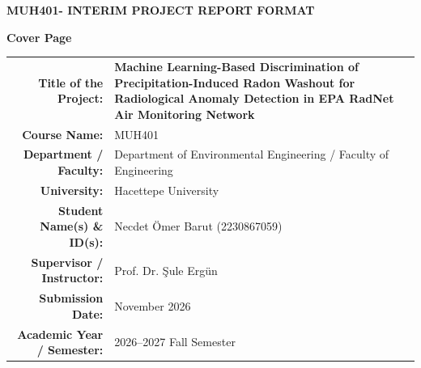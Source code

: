 \documentclass[11pt,a4paper]{article}
\begin{document}
\begin{center}
    {\Large \textbf{MUH401- INTERIM PROJECT REPORT FORMAT}}
\end{center}
\vspace{0.4em}

\begin{framed}
\noindent\textbf{Cover Page}\\[0.4em]
\begin{center}
\renewcommand{\arraystretch}{1.25}
\begin{tabular}{r @{\hspace{0.8em}} l}
\textbf{Title of the Project:} & \parbox[t]{0.68\textwidth}{\raggedright \textbf{Machine Learning-Based Discrimination of Precipitation-Induced Radon Washout for Radiological Anomaly Detection in EPA RadNet Air Monitoring Network}} \\[0.8em]
\textbf{Course Name:} & MUH401 \\[0.4em]
\textbf{Department / Faculty:} & Department of Environmental Engineering / Faculty of Engineering \\[0.4em]
\textbf{University:} & Hacettepe University \\[0.4em]
\textbf{Student Name(s) \& ID(s):} & Necdet Ömer Barut (2230867059) \\[0.4em]
\textbf{Supervisor / Instructor:} & Prof. Dr. Şule Ergün \\[0.4em]
\textbf{Submission Date:} & November 2026 \\[0.4em]
\textbf{Academic Year / Semester:} & 2026--2027 Fall Semester
\end{tabular}
\end{center}
\end{framed}

\vspace{0.6em}
\end{document}
